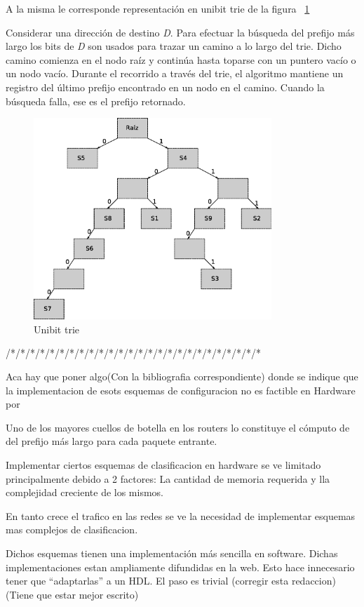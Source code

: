 A la misma le corresponde representación en unibit trie de la figura ~\ref{fig:trie}

Considerar una dirección de destino \textit{D}. Para efectuar la búsqueda del prefijo más largo los bits de \textit{D} son usados para trazar un camino a lo largo del trie. Dicho camino comienza en el nodo raíz y continúa hasta toparse con un puntero vacío o un nodo vacío. Durante el recorrido a través del trie, el algoritmo mantiene un registro del último prefijo encontrado en un nodo en el camino. Cuando la búsqueda falla, ese es el prefijo retornado.
\newpage
\begin{figure}[h]
  \centering
	\includegraphics[width=0.80\textwidth]{2-sistema/graf/trie.eps}
  \caption{Unibit trie}
  \label{fig:trie}
\end{figure}

/*/*/*/*/*/*/*/*/*/*/*/*/*/*/*/*/*/*/*/*/*/*/*/*/*/*

{Aca hay que poner algo(Con la bibliografia correspondiente) donde se indique que la implementacion de esots esquemas de configuracion no es factible en Hardware por}

Uno de los mayores cuellos de botella en los routers lo constituye el cómputo de del prefijo más largo para cada paquete entrante.

Implementar ciertos esquemas de clasificacion en hardware se ve limitado principalmente debido a 2 factores: La cantidad de memoria requerida y lla complejidad creciente de los mismos.

En tanto crece el trafico en las redes se ve la necesidad de implementar esquemas mas complejos de clasificacion.

Dichos esquemas tienen una implementación más sencilla en software. Dichas implementaciones estan ampliamente difundidas en la web.
Esto hace innecesario tener que “adaptarlas” a un HDL. El paso es trivial (corregir esta redaccion)
(Tiene que estar mejor escrito)


